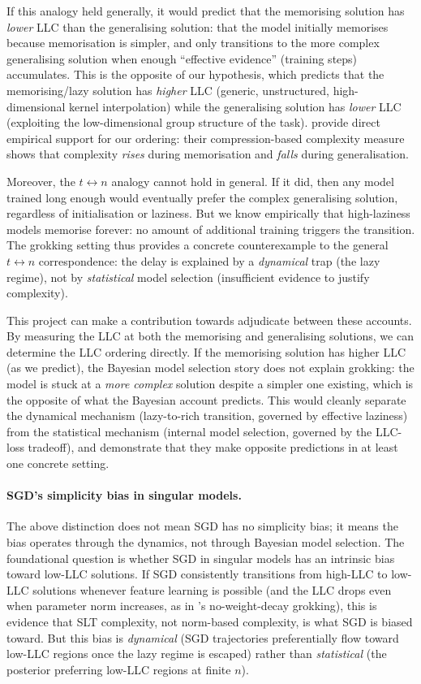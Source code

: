 \documentclass[11pt,a4paper]{article}
\begin{document}
If this analogy held generally, it would predict that the memorising solution has \emph{lower} LLC than the generalising solution: that the model initially memorises because memorisation is simpler, and only transitions to the more complex generalising solution when enough ``effective evidence'' (training steps) accumulates. This is the opposite of our hypothesis, which predicts that the memorising/lazy solution has \emph{higher} LLC (generic, unstructured, high-dimensional kernel interpolation) while the generalising solution has \emph{lower} LLC (exploiting the low-dimensional group structure of the task). \citet{demoss2025complexity} provide direct empirical support for our ordering: their compression-based complexity measure shows that complexity \emph{rises} during memorisation and \emph{falls} during generalisation.

Moreover, the $t \leftrightarrow n$ analogy cannot hold in general. If it did, then any model trained long enough would eventually prefer the complex generalising solution, regardless of initialisation or laziness. But we know empirically that high-laziness models memorise forever: no amount of additional training triggers the transition. The grokking setting thus provides a concrete counterexample to the general $t \leftrightarrow n$ correspondence: the delay is explained by a \emph{dynamical} trap (the lazy regime), not by \emph{statistical} model selection (insufficient evidence to justify complexity).

This project can make a contribution towards adjudicate between these accounts. By measuring the LLC at both the memorising and generalising solutions, we can determine the LLC ordering directly. If the memorising solution has higher LLC (as we predict), the Bayesian model selection story does not explain grokking: the model is stuck at a \emph{more complex} solution despite a simpler one existing, which is the opposite of what the Bayesian account predicts. This would cleanly separate the dynamical mechanism (lazy-to-rich transition, governed by effective laziness) from the statistical mechanism (internal model selection, governed by the LLC-loss tradeoff), and demonstrate that they make opposite predictions in at least one concrete setting.

\paragraph{SGD's simplicity bias in singular models.} The above distinction does not mean SGD has no simplicity bias; it means the bias operates through the dynamics, not through Bayesian model selection. The foundational question is whether SGD in singular models has an intrinsic bias toward low-LLC solutions. If SGD consistently transitions from high-LLC to low-LLC solutions whenever feature learning is possible (and the LLC drops even when parameter norm increases, as in \citeauthor{kumar2024grokking}'s no-weight-decay grokking), this is evidence that SLT complexity, not norm-based complexity, is what SGD is biased toward. But this bias is \emph{dynamical} (SGD trajectories preferentially flow toward low-LLC regions once the lazy regime is escaped) rather than \emph{statistical} (the posterior preferring low-LLC regions at finite $n$).
\end{document}
